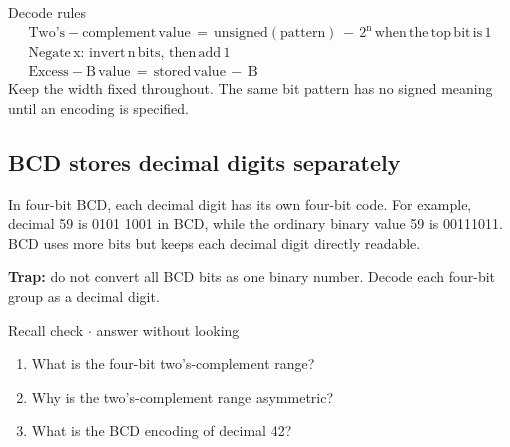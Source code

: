 \documentclass[11pt]{article}
\begin{document}
\begin{keepsection}
\begin{keepsection}
\begin{equationcard}{Decode rules}
\[ \begin{gathered} \text{Two}’\mathrm{s}-\text{complement}\, \text{value}\, =\, \text{unsigned}(\text{pattern})\, -\, 2^{\mathrm{n}}\, \text{when}\, \text{the}\, \text{top}\, \text{bit}\, \text{is}\, 1 \\ \text{Negate}\, \mathrm{x}:\, \text{invert}\, \mathrm{n}\, \text{bits},\, \text{then}\, \text{add}\, 1 \\ \text{Excess}-\mathrm{B}\, \text{value}\, =\, \text{stored}\, \text{value}\, -\, \mathrm{B} \end{gathered} \]
{\small Keep the width fixed throughout. The same bit pattern has no signed meaning until an encoding is specified.}
\end{equationcard}
\end{keepsection}

\begin{keepsection}
\subsection{BCD stores decimal digits separately}

In four-bit BCD, each decimal digit has its own four-bit code. For example, decimal 59 is 0101 1001 in BCD, while the ordinary binary value 59 is 00111011. BCD uses more bits but keeps each decimal digit directly readable.

\begin{notebox}\textbf{Trap:} do not convert all BCD bits as one binary number. Decode each four-bit group as a decimal digit.\end{notebox}

\begin{recallbox}{Recall check \ensuremath{\cdot} answer without looking}
\begin{enumerate}
\item What is the four-bit two’s-complement range?
\item Why is the two’s-complement range asymmetric?
\item What is the BCD encoding of decimal 42?
\end{enumerate}

\end{recallbox}
\end{keepsection}
\end{keepsection}
\end{document}
